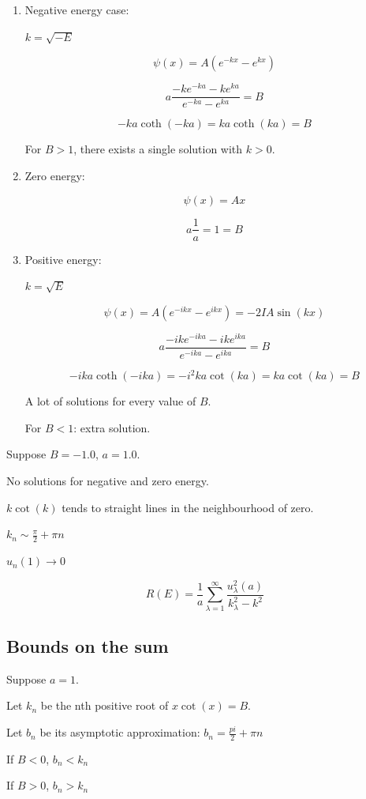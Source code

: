 \documentclass[12pt, a4paper]{article}
\begin{document}
\begin{enumerate}
\item Negative energy case:

$k = \sqrt{-E}$

$$\psi(x) = A (e^{-kx} - e^{kx})$$

$$a \frac{-k e^{-ka} - k e^{ka}}{e^{-ka} - e^{ka}} = B$$

$$-k a \coth (-ka) = k a \coth (ka) = B$$

For $B > 1$, there exists a single solution with $k > 0$.

\item Zero energy:

$$\psi(x) = Ax$$

$$a\frac{1}{a} = 1 = B$$

\item Positive energy:

$k = \sqrt{E}$

$$\psi(x) = A (e^{-ikx} - e^{ikx}) = -2 I A \sin(kx)$$

$$a \frac{-ik e^{-ika} - ik e^{ika}}{e^{-ika} - e^{ika}} = B$$

$$-i k a \coth (-ika) = -i^2 k a \cot(ka) = k a \cot(ka) = B$$

A lot of solutions for every value of $B$.

For $B < 1$: extra solution.

\end{enumerate}

Suppose $B = -1.0$, $a = 1.0$.

No solutions for negative and zero energy.

$k \cot(k)$ tends to straight lines in the neighbourhood of zero.

$k_n \sim \frac{\pi}{2} + \pi n$

$u_n(1) \to 0$


$$R(E) = \frac{1}{a} \sum\limits_{\lambda = 1}^{\infty} \frac{u_{\lambda}^2(a)}{k^2_{\lambda} - k^2}$$

\subsection{Bounds on the sum}
Suppose $a = 1$.

Let $k_n$ be the nth positive root of $x \cot(x) = B$.

Let $b_n$ be its asymptotic approximation: $b_n = \frac{pi}{2} + \pi n$

If $B < 0$, $b_n < k_n$

If $B > 0$, $b_n > k_n$
\end{document}
